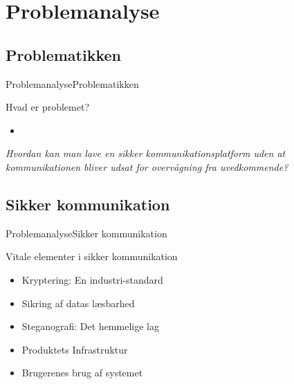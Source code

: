 \documentclass[10pt]{beamer}
\begin{document}
    \section{Problemanalyse}
    
        \subsection{Problematikken}
        \begin{frame}{Problemanalyse}{Problematikken}
            \begin{block}{Hvad er problemet?}
                \begin{itemize}
                    \item 
                \end{itemize}
                \begin{mdframed}[linewidth=0pt,backgroundcolor=lightgray!20,innertopmargin = 0.2cm,innerbottommargin = 0.2cm]
                    \footnotesize
                    \textit{Hvordan kan man lave en sikker kommunikationsplatform uden at kommunikationen bliver udsat for overvågning fra uvedkommende?}
                \end{mdframed}
            \end{block}
        \end{frame}
    
        \subsection{Sikker kommunikation}
        \begin{frame}{Problemanalyse}{Sikker kommunikation}
            \begin{block}{Vitale elementer i sikker kommunikation}
                \begin{itemize}
                    \item Kryptering: En industri-standard
                    \item Sikring af datas læsbarhed
                    \item Steganografi: Det hemmelige lag
                    \item Produktets Infrastruktur
                    \item Brugerenes brug af systemet
                \end{itemize}
            \end{block}
        \end{frame}
        
\end{document}
